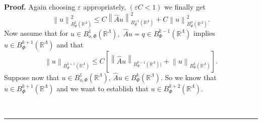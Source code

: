 \documentclass{article}
\newenvironment{proof}[1][Proof]{\noindent\textbf{#1.} }{\ \rule{0.5em}{0.5em}}
\begin{document}
\begin{proof}
Again choosing $\varepsilon $ appropriately, $\left( \varepsilon C<1\right) $
we finally get 
\begin{equation*}
\left\| u\right\| _{B_{\Phi }^{1}(\mathbb{R}^{\Lambda })}^{2}\leq C\left\| 
\hat{A}u\right\| _{B_{\Phi }^{-1}(\mathbb{R}^{\Lambda })}^{2}+C\left\|
u\right\| _{B_{\Phi }^{0}(\mathbb{R}^{\Lambda })}^{2}.
\end{equation*}%
Now assume that for $u\in B_{o,\Phi }^{1}(\mathbb{R}^{\Lambda }),$ $\hat{A}%
u=q\in B_{\Phi }^{k-1}(\mathbb{R}^{\Lambda })$ implies $u\in B_{\Phi }^{k+1}(%
\mathbb{R}^{\Lambda })$ and that 
\begin{equation}
\left\| u\right\| _{B_{\Phi }^{k+1}(\mathbb{R}^{\Lambda })}\leq C\left[
\left\| \hat{A}u\right\| _{B_{\Phi }^{k-1}(\mathbb{R}^{\Lambda }))}+\left\|
u\right\| _{B_{\Phi }^{k}(\mathbb{R}^{\Lambda })}\right] .
\end{equation}%
Suppose now that $u\in B_{o,\Phi }^{1}(\mathbb{R}^{\Lambda })$, $\hat{A}u\in
B_{\Phi }^{k}(\mathbb{R}^{\Lambda }).$ So we know that $u\in B_{\Phi }^{k+1}(%
\mathbb{R}^{\Lambda })$ and we want to establish that $u\in B_{\Phi }^{k+2}(%
\mathbb{R}^{\Lambda }).$


\end{proof}
\end{document}
